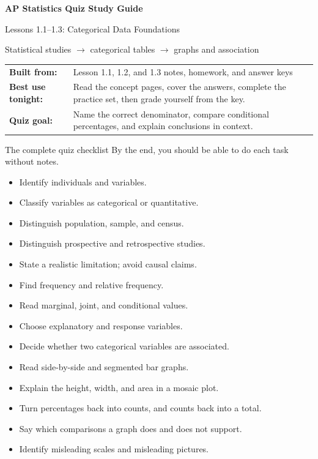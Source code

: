 \documentclass[11pt]{article}
\begin{document}
\begin{tcolorbox}[enhanced,colback=Navy,colframe=Navy,arc=3mm,boxrule=0pt,left=6mm,right=6mm,top=5mm,bottom=5mm]
{\Huge\bfseries\color{white} AP Statistics Quiz Study Guide}\par
\vspace{2pt}
{\Large\color{Gold} Lessons 1.1--1.3: Categorical Data Foundations}\par
\vspace{5pt}
{\color{white}Statistical studies $\boldsymbol{\rightarrow}$ categorical tables $\boldsymbol{\rightarrow}$ graphs and association}
\end{tcolorbox}

\begin{center}
\begin{tabularx}{0.96\textwidth}{>{\bfseries\color{Navy}}l Y}
Built from: & Lesson 1.1, 1.2, and 1.3 notes, homework, and answer keys\\
Best use tonight: & Read the concept pages, cover the answers, complete the practice set, then grade yourself from the key.\\
Quiz goal: & Name the correct denominator, compare conditional percentages, and explain conclusions in context.\\
\end{tabularx}
\end{center}

\begin{bigidea}{The complete quiz checklist}
By the end, you should be able to do each task without notes.
\begin{multicols}{2}
\begin{itemize}[label=\textcolor{Teal}{\checkmark}]
  \item Identify individuals and variables.
  \item Classify variables as categorical or quantitative.
  \item Distinguish population, sample, and census.
  \item Distinguish prospective and retrospective studies.
  \item State a realistic limitation; avoid causal claims.
  \item Find frequency and relative frequency.
  \item Read marginal, joint, and conditional values.
  \item Choose explanatory and response variables.
  \item Decide whether two categorical variables are associated.
  \item Read side-by-side and segmented bar graphs.
  \item Explain the height, width, and area in a mosaic plot.
  \item Turn percentages back into counts, and counts back into a total.
  \item Say which comparisons a graph does and does not support.
  \item Identify misleading scales and misleading pictures.
\end{itemize}
\end{multicols}
\end{bigidea}
\end{document}
